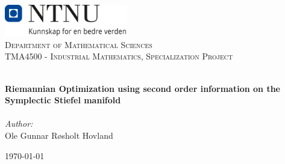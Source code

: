 
\begin{titlepage}
\vbox{ }
\vbox{ }
\begin{center}
\includegraphics[width=0.40\textwidth]{Images/NTNU_logo.png}\\[1cm]
\textsc{\LARGE Department of Mathematical Sciences}\\[1.5cm]
\textsc{\Large TMA4500 - Industrial Mathematics, Specialization Project }\\[0.5cm]
\vbox{ }

\HRule \\[0.4cm]
{ \huge \bfseries Riemannian Optimization using second order information on the Symplectic Stiefel manifold}\\[0.4cm]
\HRule \\[1.5cm]

\large
\emph{Author:}\\
Ole Gunnar Røsholt Hovland
\vfill

{\large \today}
\end{center}
\end{titlepage}